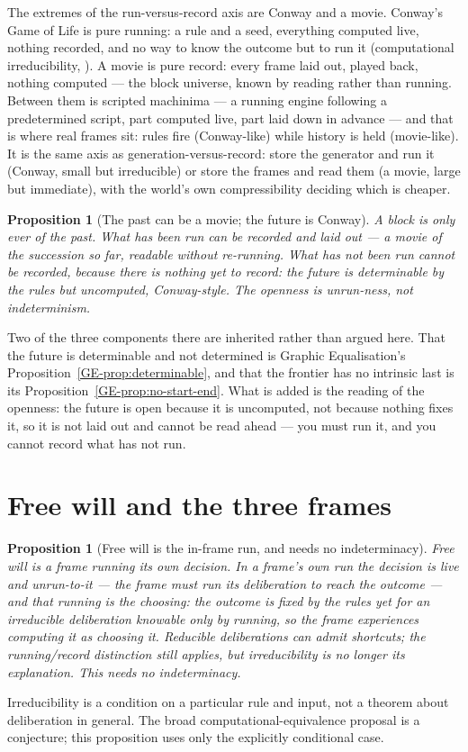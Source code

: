 \documentclass[11pt,a4paper]{article}
\newtheorem{proposition}[definition]{Proposition}
\theoremstyle{remark}\newtheorem{remark}[definition]{Remark}
\begin{document}
The extremes of the run-versus-record axis are Conway and a movie. Conway's Game
of Life is pure running: a rule and a seed, everything computed live, nothing
recorded, and no way to know the outcome but to run it (computational
irreducibility, \citealp{wolfram2002}). A movie is pure record: every frame laid out, played back,
nothing computed --- the block universe, known by reading rather than running.
Between them is scripted machinima --- a running engine following a predetermined
script, part computed live, part laid down in advance --- and that is where real
frames sit: rules fire (Conway-like) while history is held (movie-like). It is the
same axis as generation-versus-record: store the generator and run it (Conway,
small but irreducible) or store the frames and read them (a movie, large but
immediate), with the world's own compressibility deciding which is cheaper.

\begin{proposition}[The past can be a movie; the future is Conway]\label{prop:run-record}
A block is only ever of the past. What has been run can be recorded and laid out
--- a movie of the succession so far, readable without re-running. What has not
been run cannot be recorded, because there is nothing yet to record: the future is
determinable by the rules but \emph{uncomputed}, Conway-style. The openness is
unrun-ness, not indeterminism.
\end{proposition}

Two of the three components there are inherited rather than argued here. That the
future is determinable and not determined is Graphic Equalisation's
Proposition~\ref{GE-prop:determinable}, and that the frontier has no intrinsic last is
its Proposition~\ref{GE-prop:no-start-end}. What is added is the reading of the
openness: the future is open because it is uncomputed, not because nothing fixes it, so
it is not laid out and cannot be read ahead --- you must run it, and you cannot record
what has not run.

\section{Free will and the three frames}\label{sec:freewill}
\begin{proposition}[Free will is the in-frame run, and needs no indeterminacy]\label{prop:free-will}
Free will is a frame running its own decision. In a frame's own run the decision is
live and unrun-to-it --- the frame must run its deliberation to reach the outcome ---
and that running \emph{is} the choosing: the outcome is fixed by the rules yet
for an irreducible deliberation knowable only by running, so the frame experiences computing it as choosing it. Reducible deliberations can admit shortcuts; the running/record distinction still applies, but irreducibility is no longer its explanation. This
needs no indeterminacy.
\end{proposition}
Irreducibility is a condition on a particular rule and input, not a theorem
about deliberation in general. The broad computational-equivalence proposal
is a conjecture; this proposition uses only the explicitly conditional case.
\end{document}

